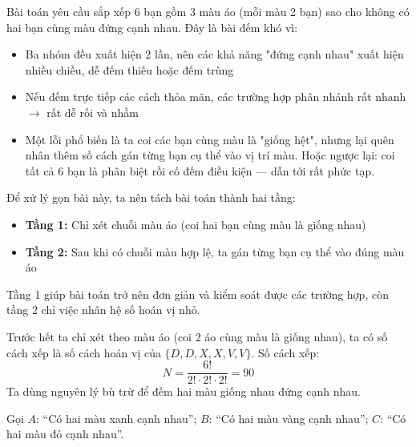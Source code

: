 \documentclass[12pt, a4paper]{article}
\begin{document}
	\vspace{0.4cm}
	\noindent{}
	
	\vspace{0.4cm}
	\noindent Bài toán yêu cầu sắp xếp 6 bạn gồm 3 màu áo (mỗi màu 2 bạn) sao cho không có hai bạn cùng màu đứng cạnh nhau. Đây là bài đếm khó vì:
	\begin{itemize}[leftmargin=*]
		\item Ba nhóm đều xuất hiện 2 lần, nên các khả năng "đứng cạnh nhau" xuất hiện nhiều chiều, dễ đếm thiếu hoặc đếm trùng
		\item Nếu đếm trực tiếp các cách thỏa mãn, các trường hợp phân nhánh rất nhanh $\rightarrow$ rất dễ rối và nhầm
		\item Một lỗi phổ biến là ta coi các bạn cùng màu là "giống hệt", nhưng lại quên nhân thêm số cách gán từng bạn cụ thể vào vị trí màu. Hoặc ngược lại: coi tất cả 6 bạn là phân biệt rồi cố đếm điều kiện --- dẫn tới rất phức tạp.
	\end{itemize}
	\noindent Để xử lý gọn bài này, ta nên tách bài toán thành hai tầng:
	\begin{itemize}[leftmargin=*]
		\item \textbf{Tầng 1:} Chỉ xét chuỗi màu áo (coi hai bạn cùng màu là giống nhau)
		\item \textbf{Tầng 2:} Sau khi có chuỗi màu hợp lệ, ta gán từng bạn cụ thể vào đúng màu áo
	\end{itemize}
	\noindent Tầng 1 giúp bài toán trở nên đơn giản và kiểm soát được các trường hợp, còn tầng 2 chỉ việc nhân hệ số hoán vị nhỏ.
	
	\vspace{0.3cm}
	\vspace{0.2cm}
	\noindent Trước hết ta chỉ xét theo màu áo (coi 2 áo cùng màu là giống nhau), ta có số cách xếp là số cách hoán vị của $\{D, D, X, X, V, V\}$. Số cách xếp:
	\[
	N = \frac{6!}{2! \cdot 2! \cdot 2!} = 90
	\]
	Ta dùng nguyên lý bù trừ để đếm hai màu giống nhau đứng cạnh nhau.
	
	\noindent Gọi $A$: ``Có hai màu xanh cạnh nhau''; $B$: ``Có hai màu vàng cạnh nhau''; $C$: ``Có hai màu đỏ cạnh nhau''.
	
\end{document}

